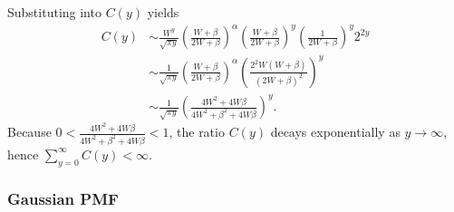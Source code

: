 Substituting into $C(y)$ yields
\begin{align}
C(y)
 &\sim \frac{W^{y}}{\sqrt{\pi y}}
        \left(\frac{W+\beta}{2W+\beta}\right)^{\alpha}
        \left(\frac{W+\beta}{2W+\beta}\right)^{y}
        \left(\frac{1}{2W+\beta}\right)^{y}
        2^{2y}\\
 &\sim \frac{1}{\sqrt{\pi y}}
        \left(\frac{W+\beta}{2W+\beta}\right)^{\alpha}
        \left(\frac{2^2W(W+\beta)}{(2W+\beta)^2}\right)^{y}\\
 &\sim \frac{1}{\sqrt{\pi y}}
        \left(\frac{4W^2+4W\beta}{4W^2+\beta^2+4W\beta}\right)^{y}.      
\end{align}
Because $0<\frac{4W^2+4W\beta}{4W^2+\beta^2+4W\beta} < 1$, the ratio $C(y)$ decays exponentially as $y \to \infty$, 
hence $\sum_{y=0}^{\infty} C(y)  <\infty$.

\subsubsection{Gaussian PMF}

